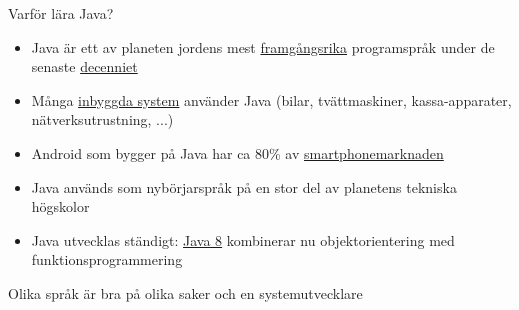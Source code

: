 \documentclass{lecturenotes}
\begin{document}
\begin{Slide}{Varför lära Java?}
\begin{itemize}
\item Java är ett av planeten jordens mest \href{http://www.tiobe.com/index.php/content/paperinfo/tpci/index.html}{framgångsrika} programspråk under de senaste \href{http://computersweden.idg.se/2.2683/1.627748/grattis-java-kungen-bland-sprak-fyller-20-ar-i-dag}{decenniet}
\item Många \href{https://docs.oracle.com/javase/8/embedded/develop-apps-platforms/overview.htm}{inbyggda system} använder Java (bilar, tvättmaskiner, kassa-apparater, nätverksutrustning, ...) 
\item Android som bygger på Java har ca 80\% av 
\href{http://www.businessinsider.com/iphone-v-android-market-share-2014-5?IR=T}{smartphonemarknaden}
\item Java används som nybörjarspråk på en stor del av planetens tekniska högskolor
\item Java utvecklas ständigt: \href{http://computersweden.idg.se/2.2683/1.546580/magisk-syntax-lyfter-java}{Java 8} kombinerar nu objektorientering med funktionsprogrammering
\end{itemize}
Olika språk är bra på olika saker och en systemutvecklare 
\end{Slide}

\end{document}
